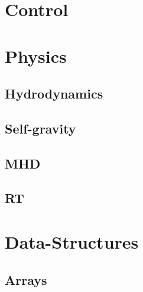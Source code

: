 \documentclass{book}
\begin{document}
\section{Control}

\section{Physics}

\subsection{Hydrodynamics}

\subsection{Self-gravity}

\subsection{MHD}

\subsection{RT}

\section{Data-Structures}

\subsection{Arrays}

\end{document}

